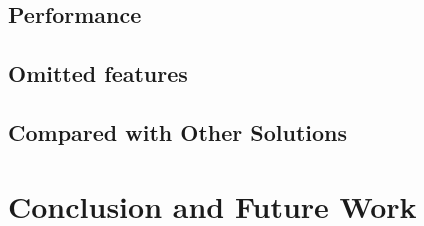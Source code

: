 \documentclass[pdftex,english,10pt,b5paper,twoside]{book}
\begin{document}
\section{Performance}

\section{Omitted features}

\section{Compared with Other Solutions}
\chapter{Conclusion and Future Work}




\appendix
\appendixpage
\addappheadtotoc
\end{document}
